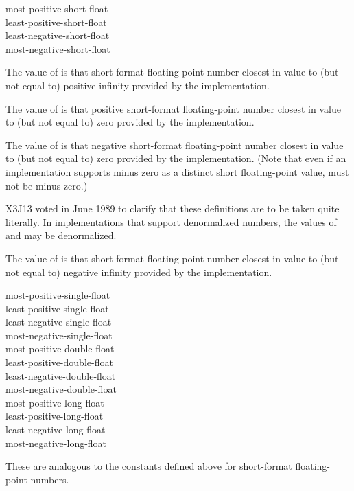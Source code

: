 \begin{defun}[Constant]
most-positive-short-float \\
least-positive-short-float \\
least-negative-short-float \\
most-negative-short-float

The value of  is that short-format
floating-point number closest in value to (but not equal to)
positive infinity provided by the implementation.

The value of  is that positive short-format
floating-point number closest in value to (but not equal to) zero provided by
the implementation.

The value of  is that negative short-format
floating-point number closest in value to (but not equal to) zero provided by
the implementation.  (Note that even if an implementation supports
minus zero as a distinct short floating-point value,
 must not be minus zero.)

\begin{newer}
X3J13 voted in June 1989 
to clarify that these definitions are to be taken quite literally.
In implementations that support denormalized numbers,
the values of  and
 may be denormalized.
\end{newer}

The value of  is that short-format
floating-point number closest in value to (but not equal to)
negative infinity provided by the implementation.
\end{defun}


\begin{defun}[Constant]
most-positive-single-float \\
least-positive-single-float \\
least-negative-single-float \\
most-negative-single-float \\
most-positive-double-float \\
least-positive-double-float \\
least-negative-double-float \\
most-negative-double-float \\
most-positive-long-float \\
least-positive-long-float \\
least-negative-long-float \\
most-negative-long-float

These are analogous to the constants defined above for short-format
floating-point numbers.
\end{defun}

